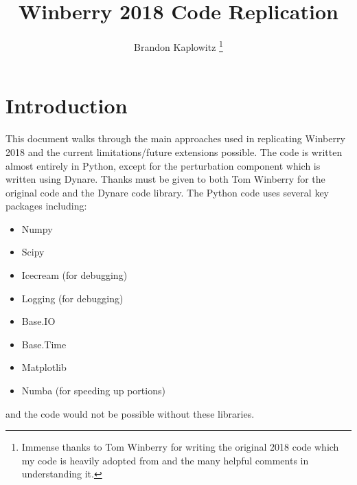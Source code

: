 \documentclass[11pt]{article}
\title{Winberry 2018 Code Replication}
\author{Brandon Kaplowitz \thanks{Immense thanks to Tom Winberry for writing the original 2018 code which my code is heavily adopted from and the many helpful comments in understanding it.}}
\begin{document}
\maketitle
\section{Introduction}
This document walks through the main approaches used in replicating Winberry 2018 and the current limitations/future extensions possible. The code is written almost entirely in Python, except for the perturbation component which is written using Dynare. Thanks must be given to both Tom Winberry for the original code and the Dynare code library. The Python code uses several key packages including:
\begin{itemize}
\item Numpy 
\item Scipy
\item Icecream (for debugging)
\item Logging (for debugging)
\item Base.IO
\item Base.Time
\item Matplotlib
\item Numba (for speeding up portions)	
\end{itemize}
and the code would not be possible without these libraries.
\end{document}
